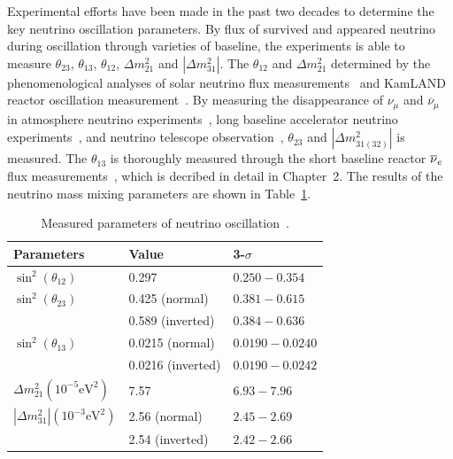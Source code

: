     Experimental efforts have been made in the past two decades to determine the key neutrino oscillation parameters.
    By flux of survived and appeared neutrino during oscillation through varieties of baseline, the experiments is able to measure $\theta_{23}$, $\theta_{13}$, $\theta_{12}$, $\Delta m^2_{21}$ and $|\Delta m^2_{31}|$. 
    The $\theta_{12}$ and $\Delta m^2_{21}$ determined by the  phenomenological analyses of solar neutrino flux measurements~\cite{bib:SNOPRC} and KamLAND reactor \nuebar oscillation measurement~\cite{bib:KamLAND03}.
    By measuring the disappearance of $\nu_\mu$ and $\overline{\nu}_\mu$ in atmosphere neutrino experiments~\cite{bib:MACRO,bib:Soudan2}, long baseline accelerator neutrino experiments~\cite{bib:k2k,bib:MINOS,bib:t2k,bib:nova}, and neutrino telescope observation~\cite{bib:ANTARES, bib:ICEosc}, $\theta_{23}$ and $|\Delta m^2_{31(32)}|$ is measured.
    The $\theta_{13}$ is thoroughly measured through the short baseline reactor $\overline{\nu }_{e}\hspace{1pt}$ flux measurements~\cite{bib:DYBosc,bib:RENO,bib:DBChooz}, which is decribed in detail in Chapter~2.
    The results of the neutrino mass mixing parameters are shown in Table~\ref{tab:1.1}.
    \begin{table}[h]
    \centering
    \begin{tabular}{lll}
    \hline
    \hline
    Parameters                  & Value             & 3-$\sigma$    \\ \hline
    $\sin^2(\theta _{12})$      & 0.297             & $0.250 - 0.354$
    \\ \hline
    $\sin^2(\theta _{23})$      & 0.425 (normal)    & $0.381 - 0.615$ \\
                                & 0.589 (inverted)  & $0.384 - 0.636$ \\ \hline
    $\sin^2(\theta_{13})$       & 0.0215 (normal)   & $0.0190 - 0.0240$ \\   
                                & 0.0216 (inverted) & $0.0190 - 0.0242$ \\ \hline
    $\Delta m^ 2_{21} (10^{-5}\textrm{eV}^2) $      & 7.57              & $6.93 - 7.96$ \\ \hline
    $|\Delta m^ 2_{31}| (10^{-3}\textrm{eV}^2) $    & 2.56 (normal)     & $2.45 - 2.69$\\
                                & 2.54 (inverted)   & $2.42 - 2.66$\\
    \hline\hline
    \end{tabular}
    \caption[Neutrino Oscillation Parameters]{Measured parameters of neutrino oscillation~\cite{bib:PDG}.}
    \label{tab:1.1}
    \end{table}
    
